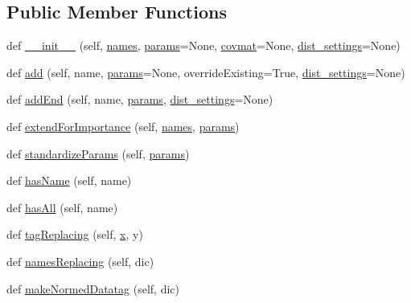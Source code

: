 \subsection*{Public Member Functions}
\begin{DoxyCompactItemize}
\item 
def \mbox{\hyperlink{classparamgrid_1_1batchjob_1_1dataSet_a70de259072c5e4c65eb476449bbebf9f}{\+\_\+\+\_\+init\+\_\+\+\_\+}} (self, \mbox{\hyperlink{classparamgrid_1_1batchjob_1_1dataSet_a86a86b957e4f12dab12516869aee8733}{names}}, \mbox{\hyperlink{classparamgrid_1_1batchjob_1_1dataSet_a6d77aeb259e7f9af2fee71288a0c8087}{params}}=None, \mbox{\hyperlink{classparamgrid_1_1batchjob_1_1dataSet_ae6ece3eca345f34b788891db79d3e342}{covmat}}=None, \mbox{\hyperlink{classparamgrid_1_1batchjob_1_1dataSet_aba36a3329ba1cc35cad06dd4e862c6bc}{dist\+\_\+settings}}=None)
\item 
def \mbox{\hyperlink{classparamgrid_1_1batchjob_1_1dataSet_aaf45e016ba6fb5889f4df3c6993b017a}{add}} (self, name, \mbox{\hyperlink{classparamgrid_1_1batchjob_1_1dataSet_a6d77aeb259e7f9af2fee71288a0c8087}{params}}=None, override\+Existing=True, \mbox{\hyperlink{classparamgrid_1_1batchjob_1_1dataSet_aba36a3329ba1cc35cad06dd4e862c6bc}{dist\+\_\+settings}}=None)
\item 
def \mbox{\hyperlink{classparamgrid_1_1batchjob_1_1dataSet_a2456e07b3b60221a0cf3d9d678ad9e1d}{add\+End}} (self, name, \mbox{\hyperlink{classparamgrid_1_1batchjob_1_1dataSet_a6d77aeb259e7f9af2fee71288a0c8087}{params}}, \mbox{\hyperlink{classparamgrid_1_1batchjob_1_1dataSet_aba36a3329ba1cc35cad06dd4e862c6bc}{dist\+\_\+settings}}=None)
\item 
def \mbox{\hyperlink{classparamgrid_1_1batchjob_1_1dataSet_ab43197301f2c4016f1445bfe73cae007}{extend\+For\+Importance}} (self, \mbox{\hyperlink{classparamgrid_1_1batchjob_1_1dataSet_a86a86b957e4f12dab12516869aee8733}{names}}, \mbox{\hyperlink{classparamgrid_1_1batchjob_1_1dataSet_a6d77aeb259e7f9af2fee71288a0c8087}{params}})
\item 
def \mbox{\hyperlink{classparamgrid_1_1batchjob_1_1dataSet_ae3061be783f0b4855bc64cd8b4f326e8}{standardize\+Params}} (self, \mbox{\hyperlink{classparamgrid_1_1batchjob_1_1dataSet_a6d77aeb259e7f9af2fee71288a0c8087}{params}})
\item 
def \mbox{\hyperlink{classparamgrid_1_1batchjob_1_1dataSet_a8cc0a618846cc7e6540f8c238c5c6d22}{has\+Name}} (self, name)
\item 
def \mbox{\hyperlink{classparamgrid_1_1batchjob_1_1dataSet_ac2211cc43454541aea7d2b36b1ceb1f4}{has\+All}} (self, name)
\item 
def \mbox{\hyperlink{classparamgrid_1_1batchjob_1_1dataSet_a8d7d924f1dccda6288c02ce9a294d5a2}{tag\+Replacing}} (self, \mbox{\hyperlink{plotTT_8m_a9336ebf25087d91c818ee6e9ec29f8c1}{x}}, y)
\item 
def \mbox{\hyperlink{classparamgrid_1_1batchjob_1_1dataSet_a1f3cc42154d9d4a05b363c1d98e329aa}{names\+Replacing}} (self, dic)
\item 
def \mbox{\hyperlink{classparamgrid_1_1batchjob_1_1dataSet_addd5471366fd629a38a1ec8f90d202a7}{make\+Normed\+Datatag}} (self, dic)
\end{DoxyCompactItemize}
